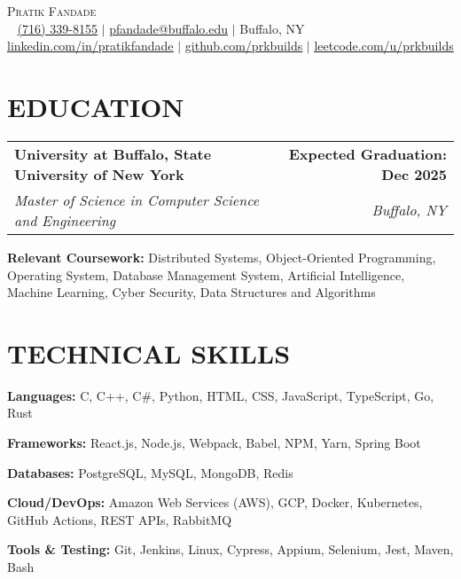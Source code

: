 \documentclass[letterpaper,10pt]{article}
\makeatletter
\newcommand{\resumeItem}[1]{
  \item\small{
    {#1}
  }
}
\newcommand{\resumeSubheading}[4]{
  \item
    \begin{tabular*}{1.0\textwidth}[t]{l@{\extracolsep{\fill}}r}
      \textbf{\normalsize#1} & \textbf{\small#4} \\
      \textit{\normalsize#3} & \textit{\small#2}
    \end{tabular*}
}
\newcommand{\resumeSubHeadingListStart}{\begin{itemize}[leftmargin=0.0in, label={}]}
\newcommand{\resumeSubHeadingListEnd}{\end{itemize}}
\newcommand{\resumeItemListStart}{\begin{itemize}}
\newcommand{\resumeItemListEnd}{\end{itemize}}
\makeatother
\begin{document}
\begin{center}
  {\huge \scshape Pratik Fandade} \\  ~
  \href{tel:+1-716-339-8155}{\underline{(716) 339-8155}} $|$
  \href{mailto:pfandade@buffalo.edu}{\underline{pfandade@buffalo.edu}} $|$
  Buffalo, NY \\
  \href{https://linkedin.com/in/pratikfandade}{\underline{linkedin.com/in/pratikfandade}} $|$
  \href{https://github.com/prkbuilds}{\underline{github.com/prkbuilds}} $|$
  \href{https://leetcode.com/u/prkbuilds/}{\underline{leetcode.com/u/prkbuilds}}
\end{center}
\section{EDUCATION}
\resumeSubHeadingListStart
  \resumeSubheading {University at Buffalo, State University of New York}{Buffalo, NY}
  {Master of Science in Computer Science and Engineering}{Expected Graduation: Dec 2025}
  \resumeItemListStart
    \small{\item{\textbf{Relevant Coursework:} Distributed Systems, Object-Oriented Programming, Operating System, Database Management System, Artificial Intelligence, Machine Learning, Cyber Security, Data Structures and Algorithms}}
  \resumeSubHeadingListEnd
\resumeSubHeadingListEnd
\section{TECHNICAL SKILLS}
\resumeItemListStart
  \small{\resumeItem{\textbf{Languages:} C, C++, C\#, Python, HTML, CSS, JavaScript, TypeScript, Go, Rust}}
  \small{\resumeItem{\textbf{Frameworks:} React.js, Node.js, Webpack, Babel, NPM, Yarn, Spring Boot}}
  \small{\resumeItem{\textbf{Databases:} PostgreSQL, MySQL, MongoDB, Redis}}
  \small{\resumeItem{\textbf{Cloud/DevOps:} Amazon Web Services (AWS), GCP, Docker, Kubernetes, GitHub Actions, REST APIs, RabbitMQ}}
  \small{\resumeItem{\textbf{Tools \& Testing:} Git, Jenkins, Linux, Cypress, Appium, Selenium, Jest, Maven, Bash}}
\resumeItemListEnd
\end{document}
